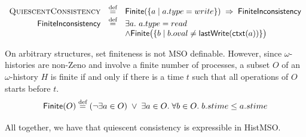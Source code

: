 $$
\begin{array}{rcl}
    \textsc{QuiescentConsistency} & \stackrel{\text{def}}{=} & \mathsf{Finite}(\{a\mid a.type=write\})\; \Rightarrow  \; \mathsf{FiniteInconsistency}
    \\
    \mathsf{FiniteInconsistency} & \stackrel{\text{def}}{=} &
    \exists a.\ a.type=read \\ 
    && \wedge \mathsf{Finite}\big(\{b\mid b.oval\neq\mathsf{lastWrite}(\mathsf{ctxt}(a))\}\big)
\end{array}
$$

On arbitrary structures, set finiteness is not MSO definable. However, since $\omega$-histories are non-Zeno and involve a finite number of processes, a subset $O$ of an $\omega$-history $H$ is finite if and only if there is a time $t$ such that all operations of $O$ starts before $t$.
$$
\mathsf{Finite}(O)\stackrel{\text{def}}{=} (\neg\exists a\in O)\; \vee\; 
\exists a\in O.\; \forall b\in O.\;b.stime\leq a.stime
$$

All together, we have that quiescent consistency is expressible in HistMSO.
